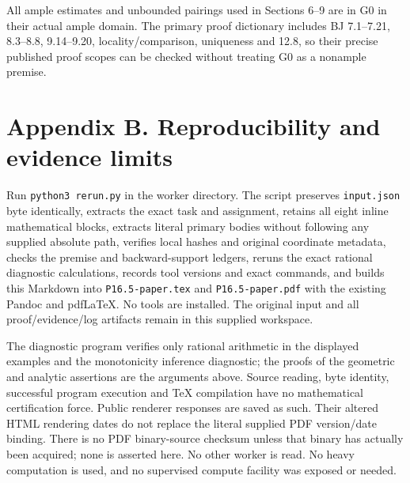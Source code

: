 \documentclass[
  10pt,
]{article}
\begin{document}
All ample estimates and unbounded pairings used in Sections 6--9 are in
G0 in their actual ample domain. The primary proof dictionary includes
BJ 7.1--7.21, 8.3--8.8, 9.14--9.20, locality/comparison, uniqueness and
12.8, so their precise published proof scopes can be checked without
treating G0 as a nonample premise.

\section{Appendix B. Reproducibility and evidence
limits}\label{appendix-b.-reproducibility-and-evidence-limits}

Run \texttt{python3\ rerun.py} in the worker directory. The script
preserves \texttt{input.json} byte identically, extracts the exact task
and assignment, retains all eight inline mathematical blocks, extracts
literal primary bodies without following any supplied absolute path,
verifies local hashes and original coordinate metadata, checks the
premise and backward-support ledgers, reruns the exact rational
diagnostic calculations, records tool versions and exact commands, and
builds this Markdown into \texttt{P16.5-paper.tex} and
\texttt{P16.5-paper.pdf} with the existing Pandoc and pdfLaTeX. No tools
are installed. The original input and all proof/evidence/log artifacts
remain in this supplied workspace.

The diagnostic program verifies only rational arithmetic in the
displayed examples and the monotonicity inference diagnostic; the proofs
of the geometric and analytic assertions are the arguments above. Source
reading, byte identity, successful program execution and TeX compilation
have no mathematical certification force. Public renderer responses are
saved as such. Their altered HTML rendering dates do not replace the
literal supplied PDF version/date binding. There is no PDF binary-source
checksum unless that binary has actually been acquired; none is asserted
here. No other worker is read. No heavy computation is used, and no
supervised compute facility was exposed or needed.
\end{document}

